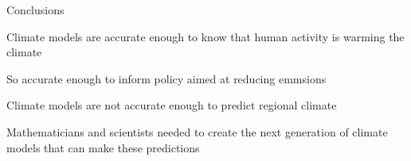 \begin{slide}{Conclusions}

\begin{list0}

\item Climate models are accurate enough to know that human activity is warming the climate\pauseHS

\item So accurate enough to inform policy aimed at reducing emmsions\pauseHS

\item Climate models are not accurate enough to predict regional climate\pauseHS

\item Mathematicians and scientists needed to create the next generation of climate models that can make these predictions
\end{list0}

\end{slide}
